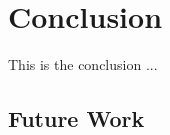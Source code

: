 \chapter{Conclusion}

\label{Chapter9_conclusion} 

\begin{comment}
-------------------------------------------------
9. Conclusion
	a. Future Work
		i. Scoring Functions Improvement
		ii. Other Improvements (UI, distribution, change of framework. electron ui -> web based. )
	b. Personal Note
-------------------------------------------------
\end{comment}

This is the conclusion ...

\section{Future Work}
\begin{comment}

	-angle, dont die if left/right. 
	-need to have a way of returning 0 if one of the fingers is compeletley off. 
	-need to be able to parameterize by finger level. (compare2). if in gesture10 we expect the pinky to be a little curved, should be able to set that parameter on that pinky in that gesture. rather than entire algorithm. need more fine tune parameterization. 
	
	
	
show the 2 figures about loading/creating user. explain why you needed ot make users. meeting with clinicians. working product demonstration. agile. as opposed ot waterfall (this should go in conclusion). 
- in the same thread, could also explain how the rotation of the hand was also the clinician's idea. 
\end{comment}




